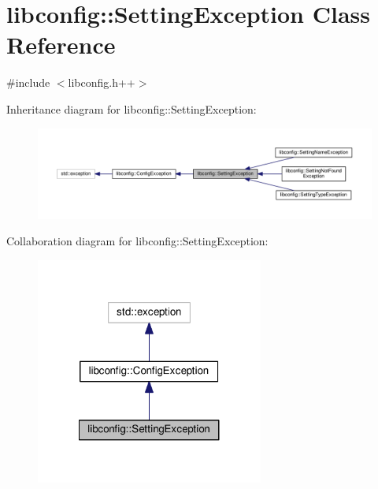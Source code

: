 \hypertarget{classlibconfig_1_1SettingException}{\section{libconfig\-:\-:Setting\-Exception Class Reference}
\label{classlibconfig_1_1SettingException}
}


{\ttfamily \#include $<$libconfig.\-h++$>$}



Inheritance diagram for libconfig\-:\-:Setting\-Exception\-:\nopagebreak
\begin{figure}[H]
\begin{center}
\leavevmode
\includegraphics[width=350pt]{classlibconfig_1_1SettingException__inherit__graph}
\end{center}
\end{figure}


Collaboration diagram for libconfig\-:\-:Setting\-Exception\-:\nopagebreak
\begin{figure}[H]
\begin{center}
\leavevmode
\includegraphics[width=212pt]{classlibconfig_1_1SettingException__coll__graph}
\end{center}
\end{figure}
